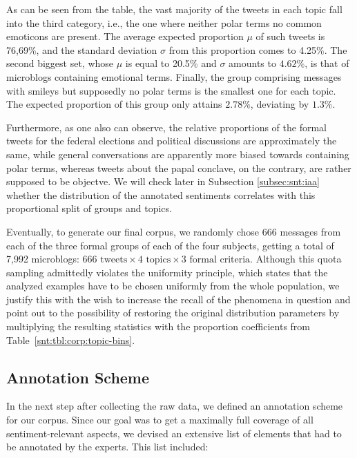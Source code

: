 As can be seen from the table, the vast majority of the tweets in each
topic fall into the third category, i.e., the one where neither polar
terms no common emoticons are present.  The average expected
proportion $\mu$ of such tweets is 76,69\%, and the standard deviation
$\sigma$ from this proportion comes to 4.25\%.  The second biggest
set, whose $\mu$ is equal to 20.5\% and $\sigma$ amounts to $4.62\%$,
is that of microblogs containing emotional terms.  Finally, the group
comprising messages with smileys but supposedly no polar terms is the
smallest one for each topic.  The expected proportion of this group
only attains $2.78\%$, deviating by $1.3\%$.

Furthermore, as one also can observe, the relative proportions of the
formal tweets for the federal elections and political discussions are
approximately the same, while general conversations are apparently
more biased towards containing polar terms, whereas tweets about the
papal conclave, on the contrary, are rather supposed to be objectve.
We will check later in Subsection \ref{subsec:snt:iaa} whether the
distribution of the annotated sentiments correlates with this
proportional split of groups and topics.

Eventually, to generate our final corpus, we randomly chose 666
messages from each of the three formal groups of each of the four
subjects, getting a total of 7,992 microblogs: $666\text{ tweets}
\times 4\text{ topics} \times 3\text{ formal criteria}$.  Although
this quota sampling admittedly violates the uniformity principle,
which states that the analyzed examples have to be chosen uniformly
from the whole population, we justify this with the wish to increase
the recall of the phenomena in question and point out to the
possibility of restoring the original distribution parameters by
multiplying the resulting statistics with the proportion coefficients
from Table~\ref{snt:tbl:corp:topic-bins}.

\subsection{Annotation Scheme}\label{subsec:snt:ascheme}
In the next step after collecting the raw data, we defined an
annotation scheme for our corpus. Since our goal was to get a
maximally full coverage of all sentiment-relevant aspects, we devised
an extensive list of elements that had to be annotated by the experts.
This list included:

